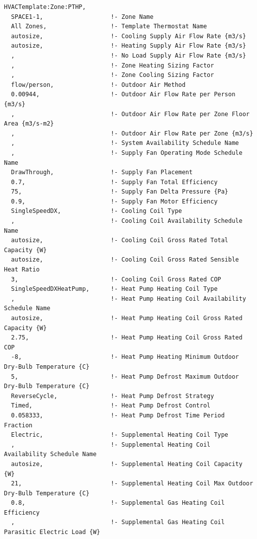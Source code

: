 \begin{lstlisting}
HVACTemplate:Zone:PTHP,
  SPACE1-1,                   !- Zone Name
  All Zones,                  !- Template Thermostat Name
  autosize,                   !- Cooling Supply Air Flow Rate {m3/s}
  autosize,                   !- Heating Supply Air Flow Rate {m3/s}
  ,                           !- No Load Supply Air Flow Rate {m3/s}
  ,                           !- Zone Heating Sizing Factor
  ,                           !- Zone Cooling Sizing Factor
  flow/person,                !- Outdoor Air Method
  0.00944,                    !- Outdoor Air Flow Rate per Person {m3/s}
  ,                           !- Outdoor Air Flow Rate per Zone Floor Area {m3/s-m2}
  ,                           !- Outdoor Air Flow Rate per Zone {m3/s}
  ,                           !- System Availability Schedule Name
  ,                           !- Supply Fan Operating Mode Schedule Name
  DrawThrough,                !- Supply Fan Placement
  0.7,                        !- Supply Fan Total Efficiency
  75,                         !- Supply Fan Delta Pressure {Pa}
  0.9,                        !- Supply Fan Motor Efficiency
  SingleSpeedDX,              !- Cooling Coil Type
  ,                           !- Cooling Coil Availability Schedule Name
  autosize,                   !- Cooling Coil Gross Rated Total Capacity {W}
  autosize,                   !- Cooling Coil Gross Rated Sensible Heat Ratio
  3,                          !- Cooling Coil Gross Rated COP
  SingleSpeedDXHeatPump,      !- Heat Pump Heating Coil Type
  ,                           !- Heat Pump Heating Coil Availability Schedule Name
  autosize,                   !- Heat Pump Heating Coil Gross Rated Capacity {W}
  2.75,                       !- Heat Pump Heating Coil Gross Rated COP
  -8,                         !- Heat Pump Heating Minimum Outdoor Dry-Bulb Temperature {C}
  5,                          !- Heat Pump Defrost Maximum Outdoor Dry-Bulb Temperature {C}
  ReverseCycle,               !- Heat Pump Defrost Strategy
  Timed,                      !- Heat Pump Defrost Control
  0.058333,                   !- Heat Pump Defrost Time Period Fraction
  Electric,                   !- Supplemental Heating Coil Type
  ,                           !- Supplemental Heating Coil Availability Schedule Name
  autosize,                   !- Supplemental Heating Coil Capacity {W}
  21,                         !- Supplemental Heating Coil Max Outdoor Dry-Bulb Temperature {C}
  0.8,                        !- Supplemental Gas Heating Coil Efficiency
  ,                           !- Supplemental Gas Heating Coil Parasitic Electric Load {W}

\end{lstlisting}
